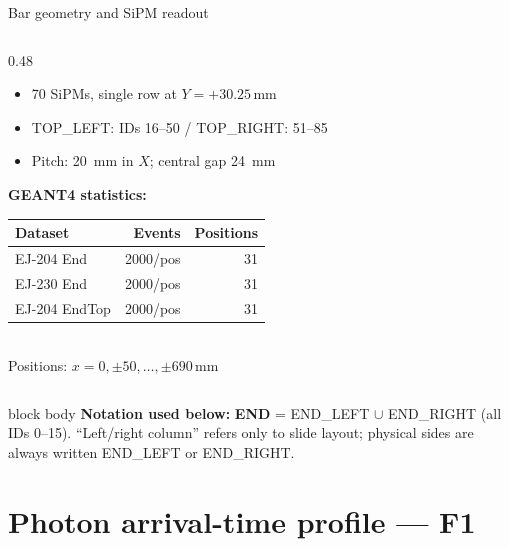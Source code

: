 \documentclass[aspectratio=169,9pt]{beamer}
\begin{document}
\begin{frame}{Bar geometry and SiPM readout}
\begin{columns}[T]
\begin{column}{0.48\textwidth}
      \begin{itemize}
        \item 70 SiPMs, single row at $Y=+30.25$\,mm
        \item TOP\_LEFT: IDs 16–50 / TOP\_RIGHT: 51–85
        \item Pitch: \SI{20}{\mm} in $X$; central gap \SI{24}{\mm}
      \end{itemize}
      \vspace{0.3em}
      \textbf{GEANT4 statistics:}
      \begin{center}
        \small
        \begin{tabular}{lrr}
          \toprule
          Dataset & Events & Positions \\
          \midrule
          EJ-204 End & 2000/pos & 31 \\
          EJ-230 End & 2000/pos & 31 \\
          EJ-204 EndTop & 2000/pos & 31 \\
          \bottomrule
        \end{tabular}\\[0.2em]
        {\footnotesize Positions: $x = 0, \pm50, \ldots, \pm690$\,mm}
      \end{center}
    \end{column}
  \end{columns}
  \vspace{-0.4em}
  \begin{beamercolorbox}[rounded=true,sep=0.45em,wd=\textwidth]{block body}
    {\scriptsize \textbf{Notation used below:} \textbf{END} = END\_LEFT $\cup$ END\_RIGHT
    (all IDs 0--15). ``Left/right column'' refers only to slide layout; physical sides are
    always written END\_LEFT or END\_RIGHT.}
  \end{beamercolorbox}
\end{frame}

\section{Photon arrival-time profile — F1}
\end{document}
